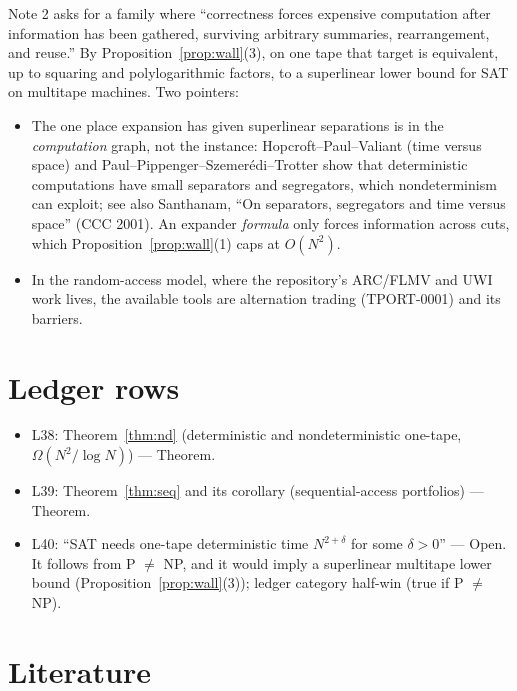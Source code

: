 \documentclass[11pt]{article}
\theoremstyle{remark}
\begin{document}
Note 2 asks for a family where ``correctness forces expensive computation after information has been
gathered, surviving arbitrary summaries, rearrangement, and reuse.'' By Proposition~\ref{prop:wall}(3), on one
tape that target is equivalent, up to squaring and polylogarithmic factors, to a superlinear lower bound for
SAT on multitape machines. Two pointers:
\begin{itemize}
\item The one place expansion has given superlinear separations is in the \emph{computation} graph, not the
instance: Hopcroft--Paul--Valiant (time versus space) and Paul--Pippenger--Szemer\'edi--Trotter show that
deterministic computations have small separators and segregators, which nondeterminism can exploit; see also
Santhanam, ``On separators, segregators and time versus space'' (CCC 2001). An expander \emph{formula} only
forces information across cuts, which Proposition~\ref{prop:wall}(1) caps at $O(N^2)$.
\item In the random-access model, where the repository's ARC/FLMV and UWI work lives, the available tools are
alternation trading (TPORT-0001) and its barriers.
\end{itemize}

\section{Ledger rows}

\begin{itemize}
\item L38: Theorem~\ref{thm:nd} (deterministic and nondeterministic one-tape, $\Omega(N^2/\log N)$) --- Theorem.
\item L39: Theorem~\ref{thm:seq} and its corollary (sequential-access portfolios) --- Theorem.
\item L40: ``SAT needs one-tape deterministic time $N^{2+\delta}$ for some $\delta>0$'' --- Open. It follows
from P $\ne$ NP, and it would imply a superlinear multitape lower bound
(Proposition~\ref{prop:wall}(3)); ledger category half-win (true if P $\ne$ NP).
\end{itemize}

\section{Literature}
\end{document}
